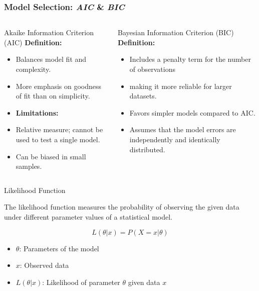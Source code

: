 \documentclass[aspectratio=169,hyperref={pdfpagelabels=false}]{beamer}
\begin{document}
\begin{frame}
  \frametitle{Model Selection: \textit{AIC} \& \textit{BIC}}
  \begin{columns}
    \begin{column}{0.5\textwidth}
      \begin{block}{Akaike Information Criterion (AIC)}
        \textbf{Definition:} 
        \begin{itemize}
          \item Balances model fit and complexity.
          \item More emphasis on goodness of fit than on simplicity.
            \item [] \textbf{Limitations:}
            \item Relative measure; cannot be used to test a single model.
            \item Can be biased in small samples.
        \end{itemize}
      \end{block}
    \end{column}
    
    \begin{column}{0.5\textwidth}
      \begin{block}{Bayesian Information Criterion (BIC)}
        \textbf{Definition:}
        \begin{itemize}
          \item Includes a penalty term for the number of observations
          \item making it more reliable for larger datasets.
          \item Favors simpler models compared to AIC.
          \item Assumes that the model errors are independently and identically distributed.
        \end{itemize}
      \end{block}
    \end{column}
  \end{columns}
\end{frame}

\begin{frame}{Likelihood Function}
  \begin{definition}
      The likelihood function measures the probability of observing the given data under different parameter values of a statistical model.
  \end{definition}
  
  \begin{equation*}
      L(\theta | x) = P(X = x | \theta)
  \end{equation*}
  
  \begin{itemize}
      \item $\theta$: Parameters of the model
      \item $x$: Observed data
      \item $L(\theta | x)$: Likelihood of parameter $\theta$ given data $x$
  \end{itemize}

\end{frame}
\end{document}
